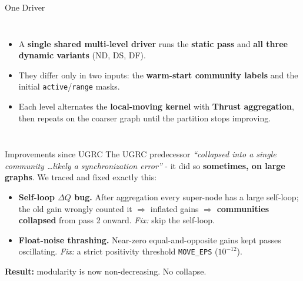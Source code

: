 \documentclass[aspectratio=169]{beamer}
\begin{document}
\begin{frame}{One Driver}
    \begin{columns}
        \begin{itemize}
            \item A \textbf{single shared multi-level driver} runs the \textbf{static pass} and
            \textbf{all three dynamic variants} (ND, DS, DF).
            \item They differ only in two inputs: the \textbf{warm-start community labels} and
            the initial \texttt{active}/\texttt{range} masks.
            \item Each level alternates the \textbf{local-moving kernel} with \textbf{Thrust
            aggregation}, then repeats on the coarser graph until the partition stops improving.
        \end{itemize}
        \centering
    \end{columns}
\end{frame}

\begin{frame}{Improvements since UGRC}
    \small
    The UGRC predecessor \emph{``collapsed into a single community \dots likely a
    synchronization error''} - it did so \textbf{sometimes, on large graphs}. We traced and
    fixed exactly this:
    \begin{itemize}
        \item \textbf{Self-loop $\Delta Q$ bug.} After aggregation every super-node has a large
        self-loop; the old gain wrongly counted it $\Rightarrow$ inflated gains $\Rightarrow$
        \textbf{communities collapsed} from pass 2 onward. \emph{Fix:} skip the self-loop.
        \item \textbf{Float-noise thrashing.} Near-zero equal-and-opposite gains kept passes
        oscillating. \emph{Fix:} a strict positivity threshold \texttt{MOVE\_EPS} ($10^{-12}$).
    \end{itemize}
    \centering\textbf{Result:} modularity is now non-decreasing. No collapse.
\end{frame}
\end{document}
